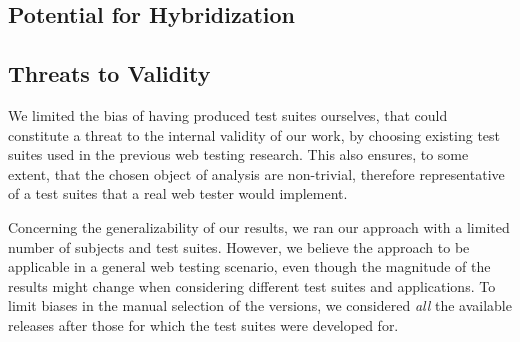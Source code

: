 \subsection{Potential for Hybridization} 

\subsection{Threats to Validity}\label{sec:ttv}

 We limited the bias of having produced test suites ourselves, that could constitute a threat to the internal validity of our work, by choosing existing test suites used in the previous web testing research. This also ensures, to some extent, that the chosen object of analysis are non-trivial, therefore representative of a test suites that a real web tester would implement. 

 Concerning the generalizability of our results, we ran our approach with a limited number of subjects and test suites. However, we believe the approach to be applicable in a general web testing scenario, even though the magnitude of the results might change when considering different test suites and applications. To limit biases in the manual selection of the versions, we considered \textit{all} the available releases after those for which the test suites were developed for.